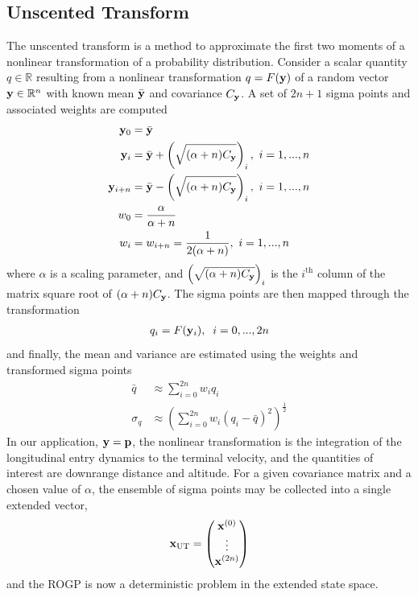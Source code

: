 \subsection{Unscented Transform}\label{Sub:UT}
The unscented transform is a method to approximate the first two moments of a nonlinear transformation of a probability distribution. Consider a scalar quantity $q\in\mathbb{R}$ resulting from a nonlinear transformation $q = F(\mathbf{y})$ of a random vector $\mathbf{y}\in\mathbb{R}^n$ with known mean $ \bar{\mathbf{y}} $ and covariance $ C_{\mathbf{y}} $. A set of $2n+1$ sigma points and associated weights are computed 
\begin{align*}
	\mathbf{y}_0 &= \bar{\mathbf{y}} \\
	\mathbf{y}_i &=  \bar{\mathbf{y}} + \left(\sqrt{(\alpha+n) C_{\mathbf{y}}}\right)_i,\, \,i=1,...,n \\
	\mathbf{y}_{i+n} &=  \bar{\mathbf{y}} - \left(\sqrt{(\alpha+n)C_{\mathbf{y}}}\right)_i, \, \,i=1,...,n\\
	w_0 &= \frac{\alpha}{\alpha+n} \\
	w_i &= w_{i+n} = \frac{1}{2(\alpha+n)}, \, \,i=1,...,n
\end{align*}
where $\alpha$ is a scaling parameter, and $\left(\sqrt{(\alpha+n)C_{\mathbf{y}}}\right)_i$ is the $i^{\mathrm{th}}$ column of the matrix square root of $(\alpha+n) C_{\mathbf{y}}$. The sigma points are then mapped through the transformation
\begin{align}
	q_i = F(\mathbf{y}_i),\;\;i=0,...,2n
\end{align}
and finally, the mean and variance are estimated using the weights and transformed sigma points
\begin{align*}
	\bar{q} &\approx \sum_{i=0}^{2n}w_iq_i\\
	\sigma_{q} &\approx \left(\sum_{i=0}^{2n}w_i\left(q_i - \bar{q}\right)^2\right)^{\frac{1}{2}}
\end{align*}
In our application, $\mathbf{y}=\mathbf{p}$, the nonlinear transformation is the integration of the longitudinal entry dynamics to the terminal velocity, and the quantities of interest are downrange distance and altitude. For a given covariance matrix and a chosen value of $\alpha$, the ensemble of sigma points may be collected into a single extended vector,
\begin{align}
	\mathbf{x}_{\mathrm{UT}} = \begin{pmatrix}
	\mathbf{x}^{(0)}\\
	\vdots\\
	\mathbf{x}^{(2n)}
	\end{pmatrix}
\end{align}
and the ROGP is now a deterministic problem in the extended state space.
